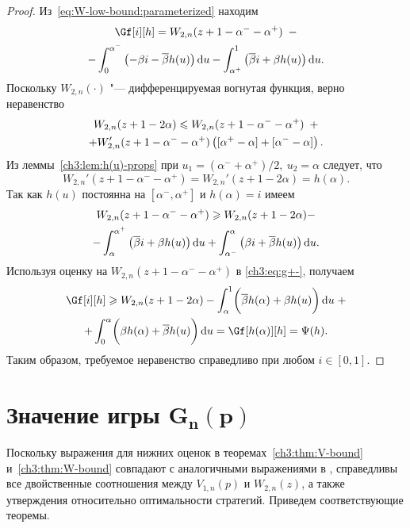 {\begin{proof}
  Из~\eqref{eq:W-low-bound:parameterized} находим
  \begin{multline}\label{ch3:eq:g+-}
    \Gf[i][h] = W_{2,n}(z + 1 - \alpha^- - \alpha^+) \enskip - \\
    - \int_0^{\alpha^-} \left(-\Co i - \DCo h(u)\right) \di u -
    \int_{\alpha^+}^1 \left(\DCo i + \Co h(u)\right) \di u.
  \end{multline}
  Поскольку $W_{2,n}(\cdot)$ "--- дифференцируемая вогнутая функция, верно неравенство
  \begin{multline*}
    W_{2,n}(z + 1 - 2\alpha) \leqslant W_{2,n}(z + 1 - \alpha^- - \alpha^+) \enskip +\\
    + W_{2,n}'(z + 1 - \alpha^- - \alpha^+) \left( [ \alpha^+ - \alpha ] + [
      \alpha^- - \alpha ] \right).
  \end{multline*}
  Из леммы~\ref{ch3:lem:h(u)-props} при $u_1 = (\alpha^- + \alpha^+)/2,\: u_2 = \alpha$ следует, что
  \[
    W_{2,n}'(z + 1 - \alpha^- - \alpha^+) = W_{2,n}'(z + 1 - 2\alpha) =
    h(\alpha).
  \]
  Так как $h(u)$ постоянна на $[\alpha^-, \alpha^+]$ и $h(\alpha) = i$ имеем
  \begin{multline*}
    W_{2,n}(z + 1 - \alpha^- - \alpha^+) \geqslant W_{2,n}(z + 1 - 2\alpha) - \\
    - \int_\alpha^{\alpha^+} \left( {{\overline{\beta}}} i + \beta h(u) \right) \mathop{}\!\mathrm{d} u +
    \int_{\alpha^-}^\alpha \left( \beta i + {{\overline{\beta}}} h(u) \right) \mathop{}\!\mathrm{d} u.
  \end{multline*}
  Используя оценку на $W_{2,n}(z + 1 - \alpha^- - \alpha^+)$ в \eqref{ch3:eq:g+-}, получаем
  \begin{multline*}
    \Gf[i][h] \geqslant W_{2,n}(z + 1 - 2\alpha)
    - \int_\alpha^1 \biggl( \DCo h(\alpha) + \Co h(u) \biggr) \di u \; + \\
    + \int_0^\alpha \biggl( \Co h(\alpha) + \DCo h(u) \biggr) \di u =
    \Gf[h(\alpha)][h] = \Psi(h).
  \end{multline*}
  Таким образом, требуемое неравенство справедливо при любом $i \in [0, 1]$.
\end{proof}

\section{Значение игры $\mathbf{G_n\left(p\right)}$}
\label{ch3:sec:game-value}

Поскольку выражения для нижних оценок в теоремах~\ref{ch3:thm:V-bound} и~\ref{ch3:thm:W-bound} совпадают с аналогичными выражениями в \cite{demeyer02}, справедливы все двойственные соотношения между $V_{1,n}(p)$ и $W_{2,n}(z)$, а также утверждения относительно оптимальности стратегий.
Приведем соответствующие теоремы.

}
